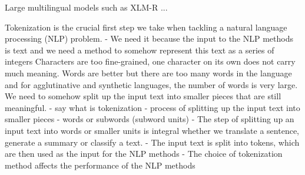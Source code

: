 



Large multilingual models such as XLM-R ...

Tokenization is the crucial first step we take when tackling a natural language processing (NLP) problem.
- We need it because the input to the NLP methods is text and we need a method to somehow represent this text as a series of integers Characters are too fine-grained, one character on its own does not carry much meaning. Words are better but there are too many words in the language and for agglutinative and synthetic languages, the number of words is very large. We need to somehow split up the input text into smaller pieces that are still meaningful.
- say what is tokenization
    - process of splitting up the input text into smaller pieces - words or subwords (subword units)
    - The step of splitting up an input text into words or smaller units is integral whether we translate a sentence, generate a summary or classify a text.
    - The input text is split into tokens, which are then used as the input for the NLP methods
    - The choice of tokenization method affects the performance of the NLP methods

